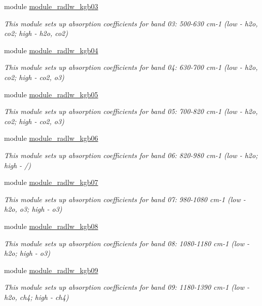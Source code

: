 \begin{DoxyCompactItemize}
module \hyperlink{namespacemodule__radlw__kgb03}{module\+\_\+radlw\+\_\+kgb03}
\begin{DoxyCompactList}\small\item\em This module sets up absorption coefficients for band 03\+: 500-\/630 cm-\/1 (low -\/ h2o, co2; high -\/ h2o, co2) \end{DoxyCompactList}\item 
module \hyperlink{namespacemodule__radlw__kgb04}{module\+\_\+radlw\+\_\+kgb04}
\begin{DoxyCompactList}\small\item\em This module sets up absorption coefficients for band 04\+: 630-\/700 cm-\/1 (low -\/ h2o, co2; high -\/ co2, o3) \end{DoxyCompactList}\item 
module \hyperlink{namespacemodule__radlw__kgb05}{module\+\_\+radlw\+\_\+kgb05}
\begin{DoxyCompactList}\small\item\em This module sets up absorption coefficients for band 05\+: 700-\/820 cm-\/1 (low -\/ h2o, co2; high -\/ co2, o3) \end{DoxyCompactList}\item 
module \hyperlink{namespacemodule__radlw__kgb06}{module\+\_\+radlw\+\_\+kgb06}
\begin{DoxyCompactList}\small\item\em This module sets up absorption coefficients for band 06\+: 820-\/980 cm-\/1 (low -\/ h2o; high -\/ /) \end{DoxyCompactList}\item 
module \hyperlink{namespacemodule__radlw__kgb07}{module\+\_\+radlw\+\_\+kgb07}
\begin{DoxyCompactList}\small\item\em This module sets up absorption coefficients for band 07\+: 980-\/1080 cm-\/1 (low -\/ h2o, o3; high -\/ o3) \end{DoxyCompactList}\item 
module \hyperlink{namespacemodule__radlw__kgb08}{module\+\_\+radlw\+\_\+kgb08}
\begin{DoxyCompactList}\small\item\em This module sets up absorption coefficients for band 08\+: 1080-\/1180 cm-\/1 (low -\/ h2o; high -\/ o3) \end{DoxyCompactList}\item 
module \hyperlink{namespacemodule__radlw__kgb09}{module\+\_\+radlw\+\_\+kgb09}
\begin{DoxyCompactList}\small\item\em This module sets up absorption coefficients for band 09\+: 1180-\/1390 cm-\/1 (low -\/ h2o, ch4; high -\/ ch4) \end{DoxyCompactList}\item 

\end{DoxyCompactItemize}
